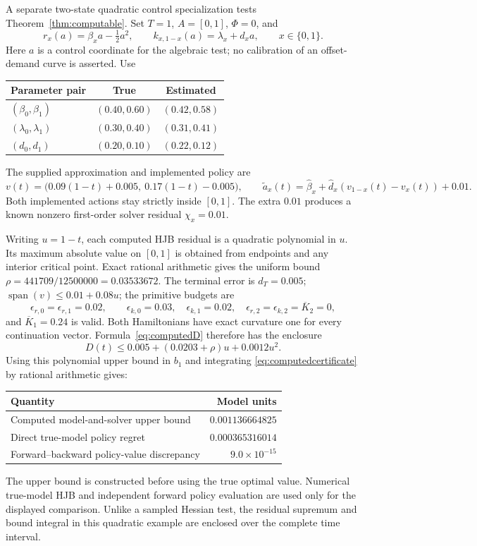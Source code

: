 \documentclass[11pt]{article}
\theoremstyle{plain}
\theoremstyle{definition}
\theoremstyle{remark}
\DeclareMathOperator{\spn}{span}
\begin{document}
A separate two-state quadratic control specialization tests
Theorem~\ref{thm:computable}. Set \(T=1\), \(A=[0,1]\), \(\Phi=0\), and
\[
r_x(a)=\beta_xa-\tfrac12a^2,\qquad
k_{x,1-x}(a)=\lambda_x+d_xa,\qquad x\in\{0,1\}.
\]
Here \(a\) is a control coordinate for the algebraic test; no
calibration of an offset-demand curve is asserted. Use
\begin{center}
\begin{tabular}{@{}lcc@{}}
\toprule
Parameter pair&True&Estimated\\
\midrule
\((\beta_0,\beta_1)\)&\((0.40,0.60)\)&\((0.42,0.58)\)\\
\((\lambda_0,\lambda_1)\)&\((0.30,0.40)\)&\((0.31,0.41)\)\\
\((d_0,d_1)\)&\((0.20,0.10)\)&\((0.22,0.12)\)\\
\bottomrule
\end{tabular}
\end{center}
The supplied approximation and implemented policy are
\[
v(t)=\big(0.09(1-t)+0.005,\ 0.17(1-t)-0.005\big),\qquad
\widetilde a_x(t)=\widehat\beta_x+
       \widehat d_x(v_{1-x}(t)-v_x(t))+0.01.
\]
Both implemented actions stay strictly inside \([0,1]\).
The extra \(0.01\) produces a known nonzero first-order solver
residual \(\chi_x=0.01\).

Writing \(u=1-t\), each computed HJB residual is a quadratic
polynomial in \(u\). Its maximum absolute value on \([0,1]\) is
obtained from endpoints and any interior critical point. Exact
rational arithmetic gives the uniform bound
\(\rho=441709/12500000=0.03533672\).
The terminal error is \(d_T=0.005\);
\(\spn(v)\le0.01+0.08u\); the primitive budgets are
\[
\epsilon_{r,0}=\epsilon_{r,1}=0.02,\qquad
\epsilon_{k,0}=0.03,\quad\epsilon_{k,1}=0.02,\quad
\epsilon_{r,2}=\epsilon_{k,2}=\overline K_2=0,
\]
and \(\overline K_1=0.24\) is valid.
Both Hamiltonians have exact curvature one for every continuation
vector. Formula~\eqref{eq:computedD} therefore has the enclosure
\[
D(t)\le
0.005+(0.0203+\rho)u+0.0012u^2.
\]
Using this polynomial upper bound in \(b_1\) and integrating
\eqref{eq:computedcertificate} by rational arithmetic gives:
\begin{center}
\begin{tabular}{@{}lr@{}}
\toprule
Quantity&Model units\\
\midrule
Computed model-and-solver upper bound&\(0.001136664825\)\\
Direct true-model policy regret&\(0.000365316014\)\\
Forward--backward policy-value discrepancy&\(9.0\times10^{-15}\)\\
\bottomrule
\end{tabular}
\end{center}
The upper bound is constructed before using the true optimal value.
Numerical true-model HJB and independent forward policy evaluation
are used only for the displayed comparison. Unlike a sampled
Hessian test, the residual supremum and bound integral in this
quadratic example are enclosed over the complete time interval.
\end{document}
